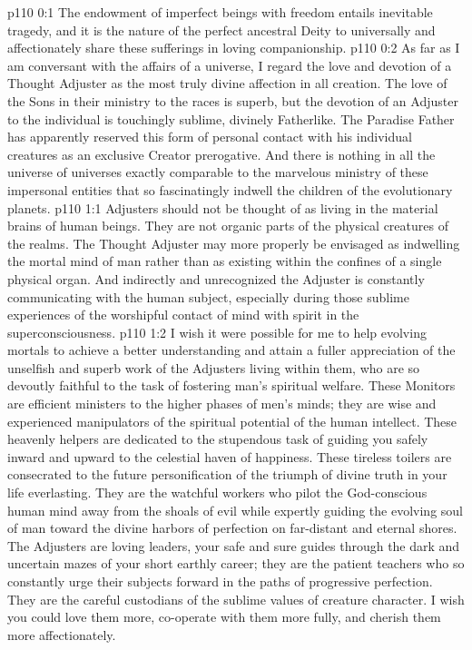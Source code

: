 \author{Solitary Messenger}
\vs p110 0:1 The endowment of imperfect beings with freedom entails inevitable tragedy, and it is the nature of the perfect ancestral Deity to universally and affectionately share these sufferings in loving companionship.
\vs p110 0:2 As far as I am conversant with the affairs of a universe, I regard the love and devotion of a Thought Adjuster as the most truly divine affection in all creation. The love of the Sons in their ministry to the races is superb, but the devotion of an Adjuster to the individual is touchingly sublime, divinely Fatherlike. The Paradise Father has apparently reserved this form of personal contact with his individual creatures as an exclusive Creator prerogative. And there is nothing in all the universe of universes exactly comparable to the marvelous ministry of these impersonal entities that so fascinatingly indwell the children of the evolutionary planets.
\vs p110 1:1 Adjusters should not be thought of as living in the material brains of human beings. They are not organic parts of the physical creatures of the realms. The Thought Adjuster may more properly be envisaged as indwelling the mortal mind of man rather than as existing within the confines of a single physical organ. And indirectly and unrecognized the Adjuster is constantly communicating with the human subject, especially during those sublime experiences of the worshipful contact of mind with spirit in the superconsciousness.
\vs p110 1:2 I wish it were possible for me to help evolving mortals to achieve a better understanding and attain a fuller appreciation of the unselfish and superb work of the Adjusters living within them, who are so devoutly faithful to the task of fostering man’s spiritual welfare. These Monitors are efficient ministers to the higher phases of men’s minds; they are wise and experienced manipulators of the spiritual potential of the human intellect. These heavenly helpers are dedicated to the stupendous task of guiding you safely inward and upward to the celestial haven of happiness. These tireless toilers are consecrated to the future personification of the triumph of divine truth in your life everlasting. They are the watchful workers who pilot the God\hyp{}conscious human mind away from the shoals of evil while expertly guiding the evolving soul of man toward the divine harbors of perfection on far\hyp{}distant and eternal shores. The Adjusters are loving leaders, your safe and sure guides through the dark and uncertain mazes of your short earthly career; they are the patient teachers who so constantly urge their subjects forward in the paths of progressive perfection. They are the careful custodians of the sublime values of creature character. I wish you could love them more, co\hyp{}operate with them more fully, and cherish them more affectionately.
